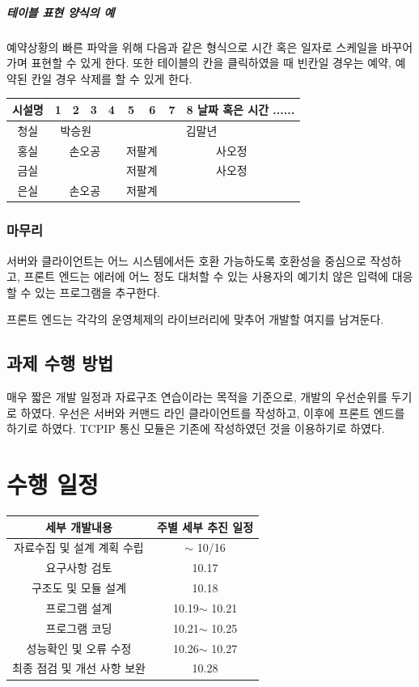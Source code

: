 \documentclass[12pt,a4paper]{report}
\begin{document}
\paragraph{테이블 표현 양식의 예}
예약상황의 빠른 파악을 위해 다음과 같은 형식으로 시간 혹은 일자로 스케일을 바꾸어 가며 표현할 수 있게 한다. 또한 테이블의 칸을 클릭하였을 때 빈칸일 경우는 예약, 예약된 칸일 경우 삭제를 할 수 있게 한다.\\
\begin{tabular}{|c|c|c|c|c|c|c|c|c|}
\hline
시설명& 1&2&3&4&5&6&7&8 날짜 혹은 시간 ......\\
\hline
청실& \multicolumn{3}{c|}{박승원} & \multicolumn{5}{c|}{김말년}\\
\hline
홍실& \multicolumn{4}{c|}{손오공}& \multicolumn{2}{c|}{저팔계}&\multicolumn{2}{c|}{사오정}\\
\hline
금실& \multicolumn{4}{c|}{}& \multicolumn{2}{c|}{저팔계}&\multicolumn{2}{c|}{사오정}\\
\hline
은실& \multicolumn{4}{c|}{손오공}& \multicolumn{2}{c|}{저팔계}&\multicolumn{2}{c|}{}\\
\hline

\end{tabular}

\subsection{마무리}
서버와 클라이언트는 어느 시스템에서든 호환 가능하도록 호환성을 중심으로 작성하고, 프론트 엔드는 에러에 어느 정도 대처할 수 있는 사용자의 예기치 않은 입력에 대응할 수 있는 프로그램을 추구한다.

프론트 엔드는 각각의 운영체제의 라이브러리에 맞추어 개발할 여지를 남겨둔다.
\section{과제 수행 방법}
매우 짧은 개발 일정과 자료구조 연습이라는 목적을 기준으로, 개발의 우선순위를 두기로 하였다.
우선은 서버와 커맨드 라인 클라이언트를 작성하고, 이후에 프론트 엔드를 하기로 하였다. 
TCPIP 통신 모듈은 기존에 작성하였던 것을 이용하기로 하였다. 
\chapter{수행 일정}
\begin{tabular}{|c|c|}
	\hline
세부 개발내용&주별 세부 추진 일정\\
\hline
자료수집 및 설계 계획 수립&$\sim$ 10/16\\
요구사항 검토&10.17\\
구조도 및 모듈 설계&10.18\\
프로그램 설계&10.19$\sim$ 10.21\\
프로그램 코딩&10.21$\sim$ 10.25\\
성능확인 및 오류 수정&10.26$\sim$ 10.27\\
최종 점검 및 개선 사항 보완&10.28\\
\hline
\end{tabular}
\end{document}
